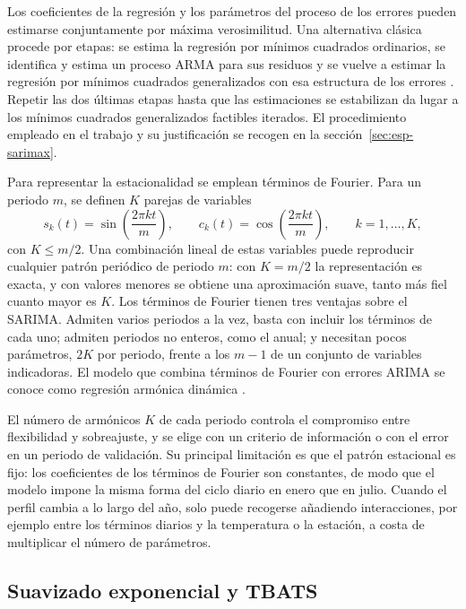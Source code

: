 Los coeficientes de la regresión y los parámetros del proceso de los
errores pueden estimarse conjuntamente por máxima verosimilitud. Una
alternativa clásica procede por etapas: se estima la regresión por mínimos
cuadrados ordinarios, se identifica y estima un proceso ARMA para sus
residuos y se vuelve a estimar la regresión por mínimos cuadrados
generalizados con esa estructura de los errores
\parencite{shumway2017time}. Repetir las dos últimas etapas hasta que las
estimaciones se estabilizan da lugar a los mínimos cuadrados generalizados
factibles iterados. El procedimiento empleado en el trabajo y su
justificación se recogen en la sección~\ref{sec:esp-sarimax}.

Para representar la estacionalidad se emplean términos de Fourier. Para un
periodo $m$, se definen $K$ parejas de variables
\begin{equation}
	s_k(t) = \sin\!\left(\frac{2\pi k t}{m}\right),
	\qquad
	c_k(t) = \cos\!\left(\frac{2\pi k t}{m}\right),
	\qquad k = 1, \dots, K,
\end{equation}
con $K \le m/2$. Una combinación lineal de estas variables puede reproducir
cualquier patrón periódico de periodo $m$: con $K = m/2$ la representación es
exacta, y con valores menores se obtiene una aproximación suave, tanto más
fiel cuanto mayor es $K$. Los términos de Fourier tienen tres ventajas sobre
el SARIMA. Admiten varios periodos a la vez, basta con incluir los términos
de cada uno; admiten periodos no enteros, como el anual; y necesitan pocos
parámetros, $2K$ por periodo, frente a los $m - 1$ de un conjunto de
variables indicadoras. El modelo que combina términos de Fourier con errores
ARIMA se conoce como regresión armónica dinámica
\parencite{hyndman2021fpp3}.

El número de armónicos $K$ de cada periodo controla el compromiso entre
flexibilidad y sobreajuste, y se elige con un criterio de información o con
el error en un periodo de validación. Su principal limitación es que el
patrón estacional es fijo: los coeficientes de los términos de Fourier son
constantes, de modo que el modelo impone la misma forma del ciclo diario en
enero que en julio. Cuando el perfil cambia a lo largo del año, solo puede
recogerse añadiendo interacciones, por ejemplo entre los términos diarios y
la temperatura o la estación, a costa de multiplicar el número de
parámetros.

\subsection{Suavizado exponencial y TBATS}\label{sec:tbats}

